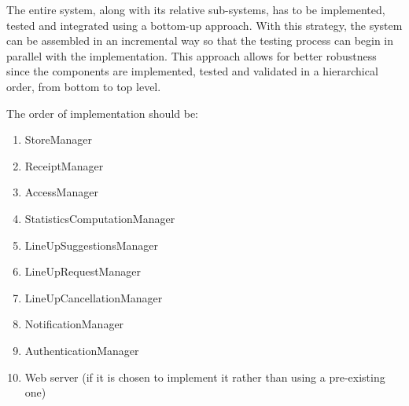 \documentclass[../../main.tex]{subfiles}
\begin{document}
The entire system, along with its relative sub-systems, has to be implemented, tested and integrated using a bottom-up approach. 
With this strategy, the system can be assembled in an incremental way so that the testing process can begin in parallel with the implementation. 
This approach allows for better robustness since the components are implemented, tested and validated in a hierarchical order, from bottom to top level.


The order of implementation should be:

\begin{enumerate}

	\item StoreManager
	\item ReceiptManager
	\item AccessManager
	\item StatisticsComputationManager
	\item LineUpSuggestionsManager
	\item LineUpRequestManager
	\item LineUpCancellationManager
	\item NotificationManager
	\item AuthenticationManager
	\item Web server (if it is chosen to implement it rather than using a pre-existing one)

\end{enumerate}

\end{document}
